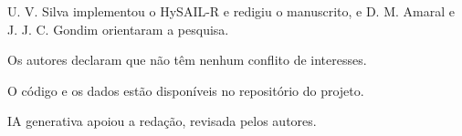 \documentclass[portuguese]{sbc2025}%
\begin{document}
\begin{declarations}

\begin{contributions}
U. V. Silva implementou o HySAIL-R e redigiu o manuscrito, e D. M. Amaral e J. J. C. Gondim orientaram a pesquisa.
\end{contributions}

\begin{interests}
Os autores declaram que não têm nenhum conflito de interesses.
\end{interests}

\begin{materials}
O código e os dados estão disponíveis no repositório do projeto.
\end{materials}

\begin{furtherinformation}
IA generativa apoiou a redação, revisada pelos autores.
\end{furtherinformation}
\end{declarations}



\end{document}
